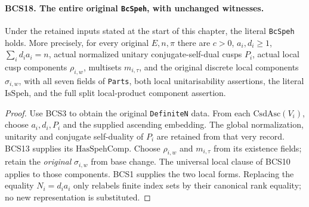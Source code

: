 \paragraph{BCS18. The entire original \texttt{BcSpeh}, with unchanged witnesses.}
\label{claim:BCS18}
Under the retained inputs stated at the start of this chapter, the
literal \texttt{BcSpeh} holds.  More precisely, for every original
\(E,n,\pi\) there are \(c>0\), \(a_i,d_i\ge1\),
\(\sum_i d_i a_i=n\), actual normalized unitary conjugate-self-dual
cusps \(P_i\), actual local cusp components \(\rho_{i,w}\),
multisets \(m_{i,\tau}\), and the original discrete local components
\(\sigma_{i,w}\), with all seven fields of \texttt{Parts}, both
local unitarisability assertions, the literal \(\mathrm{IsSpeh}\),
and the full split local-product component assertion.
\begin{proof}
Use BCS3 to obtain the original \texttt{DefiniteN} data.  From each
\(\mathrm{CsdAsc}(V_i)\), choose \(a_i,d_i,P_i\) and the
supplied ascending embedding.  The global normalization, unitarity
and conjugate self-duality of \(P_i\) are retained from that very
record.  BCS13 supplies its \(\mathrm{HasSpehComp}\).  Choose
\(\rho_{i,w}\) and \(m_{i,\tau}\) from its existence fields;
retain the \emph{original} \(\sigma_{i,w}\) from base change.
The universal local clause of BCS10 applies to those components.
BCS1 supplies the two local forms.  Replacing the equality
\(N_i=d_i a_i\) only relabels finite index sets by their canonical
rank equality; no new representation is substituted.


\end{proof}

